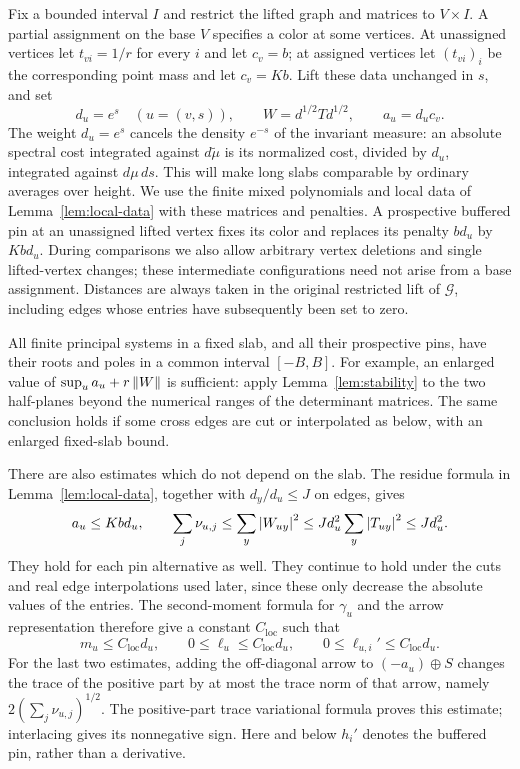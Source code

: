 Fix a bounded interval $I$ and restrict the lifted graph and matrices
to $V\times I$. A partial assignment on the base $V$ specifies a color
at some vertices. At unassigned vertices let $t_{vi}=1/r$ for every
$i$ and let $c_v=b$; at assigned vertices let $(t_{vi})_i$ be the
corresponding point mass and let $c_v=Kb$. Lift these data unchanged in
$s$, and set
\begin{equation}
 d_u=e^s\quad(u=(v,s)),\qquad
 W=d^{1/2}Td^{1/2},\qquad a_u=d_uc_v.
 \label{slab:weighted-system}
\end{equation}
The weight $d_u=e^s$ cancels the density $e^{-s}$ of the invariant
measure: an absolute spectral cost integrated against
$d\widetilde\mu$ is its normalized cost, divided by $d_u$,
integrated against $d\mu\,ds$. This will make long slabs comparable
by ordinary averages over height.
We use the finite mixed polynomials and local data of
Lemma~\ref{lem:local-data} with these matrices and penalties.
A prospective buffered pin at an unassigned lifted vertex fixes its
color and replaces its penalty $bd_u$ by $Kbd_u$. During comparisons
we also allow arbitrary vertex deletions and single lifted-vertex
changes; these intermediate configurations need not arise from a base
assignment. Distances are always taken in the original restricted
lift of $\mathcal G$, including edges whose entries have subsequently
been set to zero.

All finite principal systems in a fixed slab, and all their prospective
pins, have their roots and poles in a common interval $[-B,B]$.
For example, an enlarged value of
$\sup_u a_u+r\left\lVert W\right\rVert$ is sufficient: apply
Lemma~\ref{lem:stability} to the two half-planes beyond the numerical
ranges of the determinant matrices. The same conclusion holds if
some cross edges are cut or interpolated as below, with an enlarged
fixed-slab bound.

There are also estimates which do not depend on the slab.
The residue formula in Lemma~\ref{lem:local-data}, together with
$d_y/d_u\leq J$ on edges, gives
\[
 a_u\leq Kbd_u,\qquad
 \sum_j\nu_{u,j}
 \leq \sum_y\left|W_{uy}\right|^2
 \leq Jd_u^2\sum_y\left|T_{uy}\right|^2
 \leq Jd_u^2.
\]
They hold for each pin alternative as well. They continue to hold
under the cuts and real edge interpolations used later, since these
only decrease the absolute values of the entries. The second-moment
formula for $\gamma_u$ and the arrow representation therefore give a
constant $C_{\mathrm{loc}}$ such that
\begin{equation}
 m_u\leq C_{\mathrm{loc}}d_u,\qquad
 0\leq\ell_u\leq C_{\mathrm{loc}}d_u,\qquad
 0\leq\ell_{u,i}'\leq C_{\mathrm{loc}}d_u.
 \label{slab:local-bounds}
\end{equation}
For the last two estimates, adding the off-diagonal arrow to
$(-a_u)\oplus S$ changes the trace of the positive part by at most the
trace norm of that arrow, namely $2(\sum_j\nu_{u,j})^{1/2}$.
The positive-part trace variational formula proves this estimate;
interlacing gives its nonnegative sign. Here and below $h_i'$ denotes
the buffered pin, rather than a derivative.

